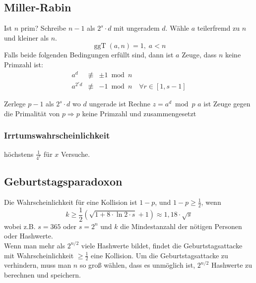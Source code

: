 \documentclass[8pt,a4paper,landscape]{article}
\begin{document}
\begin{multicols}{4}
\subsection{Miller-Rabin}
Ist $n$ prim? Schreibe $n-1$ als $2^{s}\cdot d$ mit ungeradem $d$.
Wähle $a$ teilerfremd zu $n$ und kleiner als $n$. 
\[\operatorname{ggT}(a, n) = 1, \; a<n\]
Falls beide folgenden Bedingungen erfüllt sind, dann ist $a$ Zeuge,
dass $n$ keine Primzahl ist:
\begin{eqnarray}
a^{d} &\not\equiv& \pm 1 \bmod n \nonumber\\
a^{2^{r}d} &\not\equiv& -1 \bmod n \quad \forall r \in [1,s-1]\nonumber
\end{eqnarray}
\DecMargin{1.4em}
\begin{algorithm}[H]
 Zerlege $p-1$ als $2^{s} \cdot d$ wo $d$ ungerade ist\;
 Rechne $z = a^d \bmod p$\;
\Return $a$ ist Zeuge gegen die Primalität von $p \Rightarrow p$ keine Primzahl und zusammengesetzt\;
\end{algorithm}

\subsubsection{Irrtumswahrscheinlichkeit} höchstens $\frac{1}{4^x}$ für $x$ Versuche.

\subsection{Geburtstagsparadoxon}
Die Wahrscheinlichkeit für eine Kollision ist $1-p$, und $1-p \geq \frac{1}{2}$, wenn 
\[
k \geq  \frac{1}{2} \left( \sqrt{1 + 8 \cdot \ln 2 \cdot s} + 1 \right) \approx 1,18 \cdot \sqrt{s}  
\]
wobei z.B. $s=365$ oder $s=2^n$ und $k$ die Mindestanzahl der nötigen Personen oder Hashwerte. \\
Wenn man mehr als $2^{n/2}$ viele Hashwerte bildet, findet die Geburtstagsattacke mit Wahrscheinlichkeit $\geq \frac{1}{2}$ eine Kollision. Um die Geburtstagsattacke zu verhindern, muss man $n$ so groß wählen, dass es unmöglich ist, $2^{n/2}$ Hashwerte zu berechnen und speichern.

\end{multicols}
\end{document}
